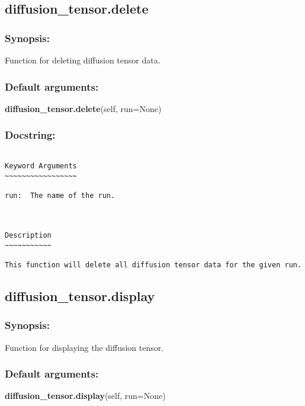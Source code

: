 \newpage

\subsection{diffusion\_tensor.delete}


\subsubsection{Synopsis:}

Function for deleting diffusion tensor data.

\subsubsection{Default arguments:}

\textsf{\textbf{diffusion\_tensor.delete}(self, run=None)
}


\subsubsection{Docstring:}

{\scriptsize
\begin{verbatim}

Keyword Arguments
~~~~~~~~~~~~~~~~~

run:  The name of the run.



Description
~~~~~~~~~~~

This function will delete all diffusion tensor data for the given run.
\end{verbatim}
}



\newpage

\subsection{diffusion\_tensor.display}


\subsubsection{Synopsis:}

Function for displaying the diffusion tensor.

\subsubsection{Default arguments:}

\textsf{\textbf{diffusion\_tensor.display}(self, run=None)
}


